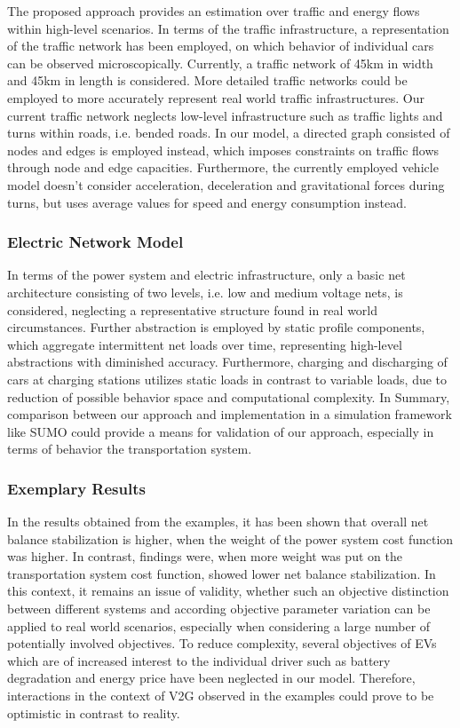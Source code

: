 The proposed approach provides an estimation over traffic and energy flows within high-level scenarios. In terms of the traffic infrastructure, a representation of the traffic network has been employed, on which behavior of individual cars can be observed microscopically. Currently, a traffic network of 45km in width and 45km in length is considered. More detailed traffic networks could be employed to more accurately represent real world traffic infrastructures. Our current traffic network neglects low-level infrastructure such as traffic lights and turns within roads, i.e. bended roads. In our model, a directed graph consisted of nodes and edges is employed instead, which imposes constraints on traffic flows through node and edge capacities. Furthermore, the currently employed vehicle model doesn't consider acceleration, deceleration and gravitational forces during turns, but uses average values for speed and energy consumption instead.

\subsubsection{Electric Network Model}

In terms of the power system and electric infrastructure, only a basic net architecture consisting of two levels, i.e. low and medium voltage nets, is considered, neglecting a representative structure found in real world circumstances. Further abstraction is employed by static profile components, which aggregate intermittent net loads over time, representing high-level abstractions with diminished accuracy. Furthermore, charging and discharging of cars at charging stations utilizes static loads in contrast to variable loads, due to reduction of possible behavior space and computational complexity. In Summary, comparison between our approach and implementation in a simulation framework like SUMO could provide a means for validation of our approach, especially in terms of behavior the transportation system.

\subsubsection{Exemplary Results}

In the results obtained from the examples, it has been shown that overall net balance stabilization is higher, when the weight of the power system cost function was higher. In contrast, findings were, when more weight was put on the transportation system cost function, showed lower net balance stabilization. In this context, it remains an issue of validity, whether such an objective distinction between different systems and according objective parameter variation can be applied to real world scenarios, especially when considering a large number of potentially involved objectives. To reduce complexity, several objectives of EVs which are of increased interest to the individual driver such as battery degradation and energy price have been neglected in our model. Therefore, interactions in the context of V2G observed in the examples could prove to be optimistic in contrast to reality. 

